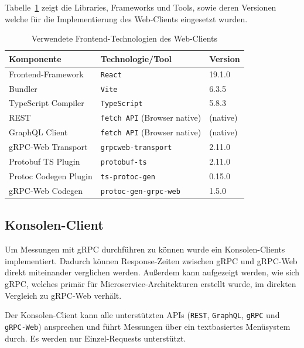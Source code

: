 \begin{enumerate}
		Tabelle~\ref{tab:frontend-tech} zeigt die Libraries, Frameworks und Tools, sowie deren Versionen welche für die Implementierung des Web-Clients eingesetzt wurden.
	
	\begin{table}[h]
		\centering
		\caption{Verwendete Frontend-Technologien des Web-Clients}
	    \label{tab:frontend-tech}
		\begin{tabular}{lll}
			\hline
			\textbf{Komponente} & \textbf{Technologie/Tool} & \textbf{Version} \\
			\hline
			Frontend-Framework & \texttt{React} & 19.1.0 \\
			Bundler & \texttt{Vite} & 6.3.5 \\
			TypeScript Compiler & \texttt{TypeScript} & 5.8.3 \\
			REST & \texttt{fetch API} (Browser native) & (native) \\
			GraphQL Client & \texttt{fetch API} (Browser native) & (native) \\
			gRPC-Web Transport & \texttt{grpcweb-transport} & 2.11.0 \\
			Protobuf TS Plugin & \texttt{protobuf-ts} & 2.11.0 \\
			Protoc Codegen Plugin & \texttt{ts-protoc-gen} & 0.15.0 \\
			gRPC-Web Codegen & \texttt{protoc-gen-grpc-web} & 1.5.0 \\
			\hline
		\end{tabular}
	\end{table}
	
	\subsection{Konsolen-Client}
	 Um Messungen mit gRPC durchführen zu können wurde ein Konsolen-Clients implementiert. Dadurch können Response-Zeiten zwischen gRPC und gRPC-Web direkt miteinander verglichen werden. Außerdem kann aufgezeigt werden, wie sich gRPC, welches primär für Microservice-Architekturen erstellt wurde, im direkten Vergleich zu gRPC-Web verhält.
	
	Der Konsolen-Client kann alle unterstützten APIs (\texttt{REST}, \texttt{GraphQL}, \texttt{gRPC} und \texttt{gRPC-Web}) ansprechen und führt Messungen über ein textbasiertes Menüsystem durch.  
	Es werden nur Einzel-Requests unterstützt.
	

\end{enumerate}
